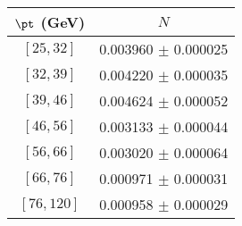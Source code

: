 \begin{tabular}{c||c}
$\pt$ (GeV) & $N$  \\
\hline
$[25, 32]$ & 0.003960 $\pm$ 0.000025\\
$[32, 39]$ & 0.004220 $\pm$ 0.000035\\
$[39, 46]$ & 0.004624 $\pm$ 0.000052\\
$[46, 56]$ & 0.003133 $\pm$ 0.000044\\
$[56, 66]$ & 0.003020 $\pm$ 0.000064\\
$[66, 76]$ & 0.000971 $\pm$ 0.000031\\
$[76, 120]$ & 0.000958 $\pm$ 0.000029\\
\end{tabular}
